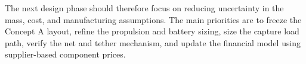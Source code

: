 The next design phase should therefore focus on reducing uncertainty in the mass, cost, and manufacturing assumptions. The main priorities are to freeze the Concept A layout, refine the propulsion and battery sizing, size the capture load path, verify the net and tether mechanism, and update the financial model using supplier-based component prices.

























